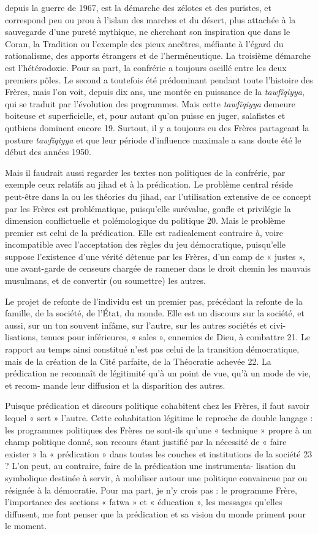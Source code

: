 depuis la guerre de 1967, est la démarche des zélotes et des puristes,
et correspond peu ou prou à l'islam des marches et du désert, plus
attachée à la sauvegarde d'une pureté mythique, ne cherchant son
inspiration que dans le Coran, la Tradition ou l'exemple des pieux
ancêtres, méfiante à l'égard du rationalisme, des apports étrangers et
de l'herméneutique. La troisième démarche est l'hétérodoxie. Pour sa
part, la confrérie a toujours oscillé entre les deux premiers pôles. Le
second a toutefois été prédominant pendant toute l'histoire des Frères,
mais l'on voit, depuis dix ans, une montée en puissance de la
\emph{tawfîqiyya}, qui se traduit par l'évolution des programmes. Mais
cette \emph{tawfîqiyya} demeure boiteuse et superficielle, et, pour
autant qu'on puisse en juger, salafistes et qutbiens dominent encore 19.
Surtout, il y a toujours eu des Frères partageant la posture
\emph{tawfîqiyya} et que leur période d'influence maximale a sans doute
été le début des années 1950.

Mais il faudrait aussi regarder les textes non politiques de la
confrérie, par exemple ceux relatifs au jihad et à la prédication. Le
problème central réside peut-être dans la ou les théories du jihad, car
l'utilisation extensive de ce concept par les Frères est problématique,
puisqu'elle surévalue, gonfle et privilégie la dimension conflictuelle
et polémologique du politique 20. Mais le problème premier est celui de
la prédication. Elle est radicalement contraire à, voire incompatible
avec l'acceptation des règles du jeu démocratique, puisqu'elle suppose
l'existence d'une vérité détenue par les Frères, d'un camp de « justes
», une avant-garde de censeurs chargée de ramener dans le droit chemin
les mauvais musulmans, et de convertir (ou soumettre) les autres.

Le projet de refonte de l'individu est un premier pas, précédant la
refonte de la famille, de la société, de l'État, du monde. Elle est un
discours sur la société, et aussi, sur un ton souvent infâme, sur
l'autre, sur les autres sociétés et civi- lisations, tenues pour
inférieures, « sales », ennemies de Dieu, à combattre 21. Le rapport au
temps ainsi constitué n'est pas celui de la transition démocratique,
mais de la création de la Cité parfaite, de la Théocratie achevée 22. La
prédication ne reconnaît de légitimité qu'à un point de vue, qu'à un
mode de vie, et recom- mande leur diffusion et la disparition des
autres.

Puisque prédication et discours politique cohabitent chez les Frères, il
faut savoir lequel « sert » l'autre. Cette cohabitation légitime le
reproche de double langage : les programmes politiques des Frères ne
sont-ils qu'une « technique » propre à un champ politique donné, son
recours étant justifié par la nécessité de « faire exister » la «
prédication » dans toutes les couches et institutions de la société 23 ?
L'on peut, au contraire, faire de la prédication une instrumenta-
lisation du symbolique destinée à servir, à mobiliser autour une
politique convaincue par ou résignée à la démocratie. Pour ma part, je
n'y crois pas : le programme Frère, l'importance des sections « fatwa »
et « éducation », les messages qu'elles diffusent, me font penser que la
prédication et sa vision du monde priment pour le moment.

